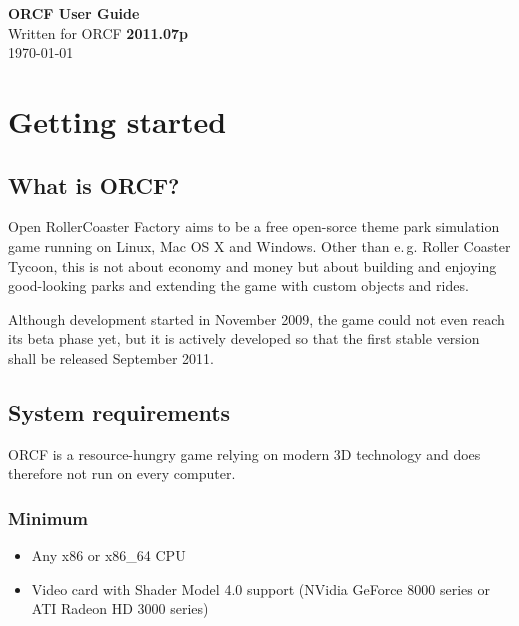\documentclass[a4paper]{article}
\begin{document}
\pagestyle{fancy}
\fancyhf{}
\fancyfoot[R]{\huge{\thepage}}

\vspace*{\fill}
\begin{center}
  \Huge{\textbf{ORCF User Guide}} \\
  \vspace{2cm}
  \large{Written for ORCF \textbf{2011.07p}} \\
  \vspace{1cm}
  \large{\today}
  \vspace{3cm}
\end{center}
\vfill

\newpage

\tableofcontents

\newpage

\section{Getting started}
\subsection{What is ORCF?}
Open RollerCoaster Factory aims to be a free open-sorce theme park simulation game running on Linux, Mac OS X and Windows. Other than e.\,g.
Roller Coaster Tycoon, this is not about economy and money but about building and enjoying good-looking parks and extending the game with
custom objects and rides.

Although development started in November 2009, the game could not even reach its beta phase yet, but it is actively developed so that the first
stable version shall be released September 2011.


\subsection{System requirements}
ORCF is a resource-hungry game relying on modern 3D technology and does therefore not run on every computer.

\subsubsection{Minimum}
\begin{itemize}
  \item Any x86 or x86\_64 CPU
  \item Video card with Shader Model 4.0 support (NVidia GeForce 8000 series or ATI Radeon HD 3000 series)
\end{itemize}
\end{document}
